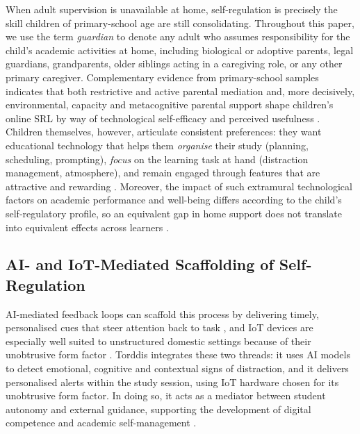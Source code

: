 When adult supervision is unavailable at home, self-regulation is precisely the skill children of primary-school age are still consolidating. Throughout this paper, we use the term \textit{guardian} to denote any adult who assumes responsibility for the child's academic activities at home, including biological or adoptive parents, legal guardians, grandparents, older siblings acting in a caregiving role, or any other primary caregiver. Complementary evidence from primary-school samples indicates that both restrictive and active parental mediation and, more decisively, environmental, capacity and metacognitive parental support shape children's online SRL by way of technological self-efficacy and perceived usefulness \citep{Wang2025Cultivating,An2024Relationship}. Children themselves, however, articulate consistent preferences: they want educational technology that helps them \textit{organise} their study (planning, scheduling, prompting), \textit{focus} on the learning task at hand (distraction management, atmosphere), and remain engaged through features that are attractive and rewarding \citep{Amaefule2025Childrens}. Moreover, the impact of such extramural technological factors on academic performance and well-being differs according to the child's self-regulatory profile, so an equivalent gap in home support does not translate into equivalent effects across learners \citep{Chen2024Extramural}.

\subsection{AI- and IoT-Mediated Scaffolding of Self-Regulation}
\label{sec:ai-iot-scaffolding}
AI-mediated feedback loops can scaffold this process by delivering timely, personalised cues that steer attention back to task \citep{Wang2025Development, Li2024Systematic}, and IoT devices are especially well suited to unstructured domestic settings because of their unobtrusive form factor \citep{Ackermans2025Young}. Torddis integrates these two threads: it uses AI models to detect emotional, cognitive and contextual signs of distraction, and it delivers personalised alerts within the study session, using IoT hardware chosen for its unobtrusive form factor. In doing so, it acts as a mediator between student autonomy and external guidance, supporting the development of digital competence and academic self-management \citep{Loh2025Plugging, Mohamed2018Implementing, Echeverria2011AFramework}.

